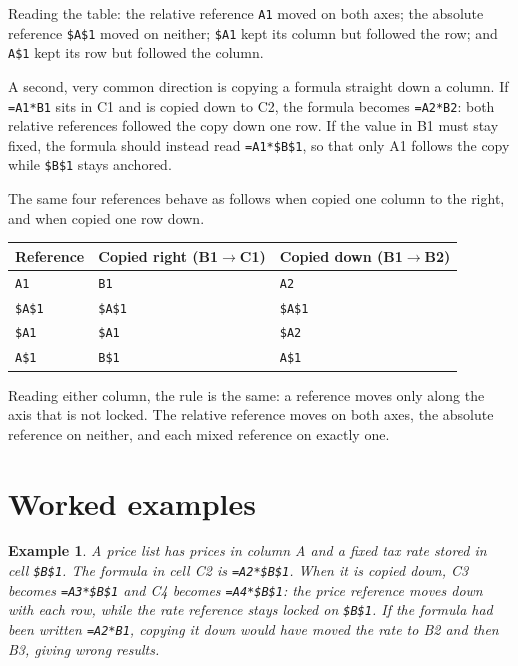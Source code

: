 \documentclass[11pt]{article}
\newtheorem{example}{Example}[section]
\begin{document}
Reading the table: the relative reference \texttt{A1} moved on both axes; the
absolute reference \texttt{\$A\$1} moved on neither; \texttt{\$A1} kept its
column but followed the row; and \texttt{A\$1} kept its row but followed the
column.

A second, very common direction is copying a formula straight down a column.
If \texttt{=A1*B1} sits in C1 and is copied down to C2, the formula becomes
\texttt{=A2*B2}: both relative references followed the copy down one row. If
the value in B1 must stay fixed, the formula should instead read
\texttt{=A1*\$B\$1}, so that only A1 follows the copy while \texttt{\$B\$1}
stays anchored.

The same four references behave as follows when copied one column to the
right, and when copied one row down.

\begin{center}
\begin{tabular}{p{}p{}p{}}
\toprule
\textbf{Reference} & \textbf{Copied right (B1$\rightarrow$C1)} & \textbf{Copied down (B1$\rightarrow$B2)} \\
\midrule
\texttt{A1} & \texttt{B1} & \texttt{A2} \\
\texttt{\$A\$1} & \texttt{\$A\$1} & \texttt{\$A\$1} \\
\texttt{\$A1} & \texttt{\$A1} & \texttt{\$A2} \\
\texttt{A\$1} & \texttt{B\$1} & \texttt{A\$1} \\
\bottomrule
\end{tabular}
\end{center}

Reading either column, the rule is the same: a reference moves only along the
axis that is not locked. The relative reference moves on both axes, the
absolute reference on neither, and each mixed reference on exactly one.

\section{Worked examples}

\begin{example}
A price list has prices in column A and a fixed tax rate stored in cell
\texttt{\$B\$1}. The formula in cell C2 is \texttt{=A2*\$B\$1}. When it is
copied down, C3 becomes \texttt{=A3*\$B\$1} and C4 becomes \texttt{=A4*\$B\$1}:
the price reference moves down with each row, while the rate reference stays
locked on \texttt{\$B\$1}. If the formula had been written \texttt{=A2*B1},
copying it down would have moved the rate to B2 and then B3, giving wrong
results.
\end{example}
\end{document}
